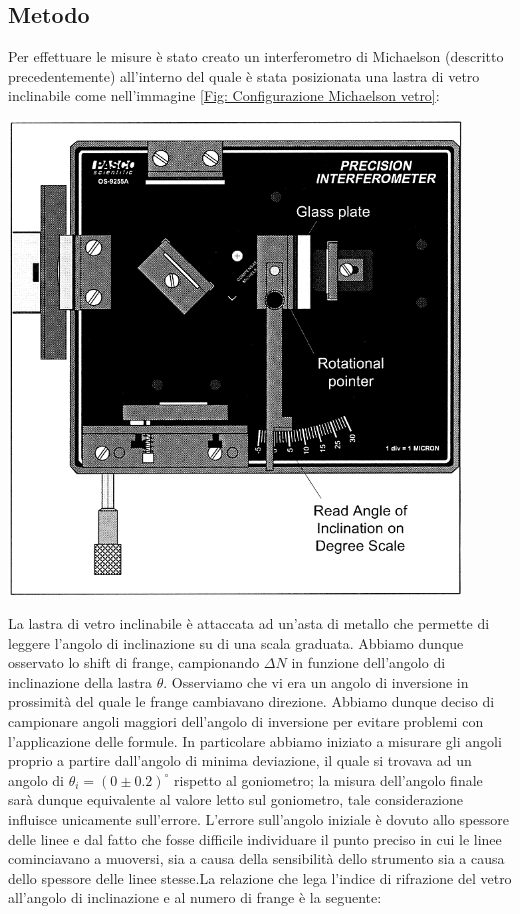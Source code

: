 \documentclass[a4paper]{article}
\begin{document}
\subsection{Metodo}
Per effettuare le misure è stato creato un interferometro di Michaelson (descritto precedentemente) all'interno del quale è stata posizionata una lastra di vetro inclinabile come nell'immagine \ref{Fig: Configurazione Michaelson vetro}:
\begin{center}
	\includegraphics[width=0.9\textwidth]{./grafici/Michaelson vetro.png}
\label{Fig: Configurazione Michaelson vetro}
\end{center}
La lastra di vetro inclinabile è attaccata ad un'asta di metallo che permette di leggere l'angolo di inclinazione su di una scala graduata. Abbiamo dunque osservato lo shift di frange, campionando $\Delta N$ in funzione dell'angolo di inclinazione della lastra $\theta$. Osserviamo che vi era un angolo di inversione in prossimità del quale le frange cambiavano direzione. Abbiamo dunque deciso di campionare angoli maggiori dell'angolo di inversione per evitare problemi con l'applicazione delle formule. In particolare abbiamo iniziato a misurare gli angoli proprio a partire dall'angolo di minima deviazione, il quale si trovava ad un angolo di $\theta_i = (0\pm 0.2)^\circ$ rispetto al goniometro; la misura dell'angolo finale sarà dunque equivalente al valore letto sul goniometro, tale considerazione influisce unicamente sull'errore. L'errore sull'angolo iniziale è dovuto allo spessore delle linee e dal fatto che fosse difficile individuare il punto preciso in cui le linee cominciavano a muoversi, sia a causa della sensibilità dello strumento sia a causa dello spessore delle linee stesse.La relazione che lega l'indice di rifrazione del vetro all'angolo di inclinazione e al numero di frange è la seguente:
\end{document}
